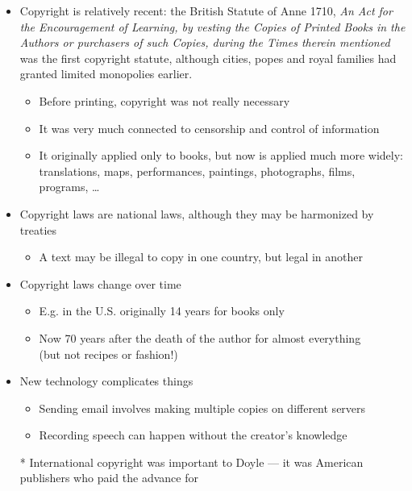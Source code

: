 \documentclass[a4paper,landscape,headrule,footrule,xetex]{foils}
\begin{document}
\begin{itemize}
\newpage
\item Copyright is relatively recent: the British Statute of Anne
  1710, \textit{An Act for the Encouragement of Learning, by
  vesting the Copies of Printed Books in the Authors or purchasers of
  such Copies, during the Times therein mentioned} was the first
  copyright statute, although cities, popes and royal families had
  granted limited monopolies earlier.
  \begin{itemize}
  \item Before printing, copyright was not really necessary
  \item It was very much connected to censorship and control of information
  \item It originally applied only to books, but now is applied much
    more widely: translations, maps, performances, paintings,
    photographs, films, programs, \ldots
  \end{itemize}
\item Copyright laws are national laws, although they may be
  harmonized by treaties
  \begin{itemize}
  \item A text may be illegal to copy in one country, but legal in another
  \end{itemize}
\item Copyright laws change over time
  \begin{itemize}
  \item E.g. in the U.S. originally 14 years for books only
  \item Now 70 years after the death of the author for almost
    everything \\ (but not recipes or fashion!)
  \end{itemize}
\newpage
\item New technology complicates things
  \begin{itemize}
  \item Sending email involves making multiple copies on different servers
  \item Recording speech can happen without the creator's knowledge
  \end{itemize}
\item[*] International copyright was important to Doyle --- it was
  American publishers who paid the advance for 

\end{itemize}


\end{document}
